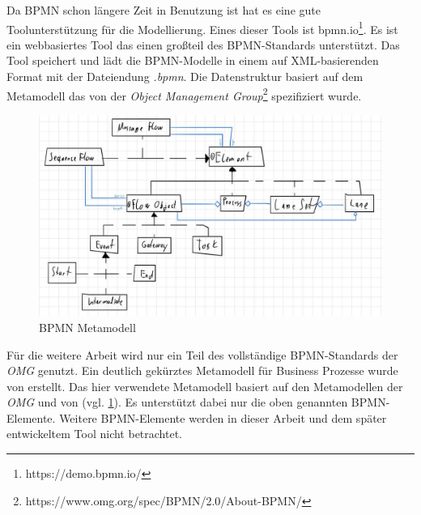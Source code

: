 Da BPMN schon längere Zeit in Benutzung ist hat es eine gute Toolunterstützung für die Modellierung.
Eines dieser Tools ist bpmn.io\footnote{https://demo.bpmn.io/}.
Es ist ein webbasiertes Tool das einen großteil des BPMN-Standards unterstützt.
Das Tool speichert und lädt die BPMN-Modelle in einem auf XML-basierenden Format mit der Dateiendung \emph{.bpmn}.
Die Datenstruktur basiert auf dem Metamodell das von der \emph{Object Management Group}\footnote{https://www.omg.org/spec/BPMN/2.0/About-BPMN/} spezifiziert wurde.

\begin{figure}
    \centering
    \includegraphics[width=\textwidth,keepaspectratio]{../images/bpmnMetamodell.jpg}%
    \caption{BPMN Metamodell}%
    \label{fig:bpmnMetamodell}
\end{figure}

Für die weitere Arbeit wird nur ein Teil des vollständige BPMN-Standards der \emph{OMG} genutzt.
Ein deutlich gekürztes Metamodell für Business Prozesse wurde von \cite{Loja2010} erstellt.
Das hier verwendete Metamodell basiert auf den Metamodellen der \emph{OMG} und von \cite{Loja2010} (vgl. \cref{fig:bpmnMetamodell}).
Es unterstützt dabei nur die oben genannten BPMN-Elemente.
Weitere BPMN-Elemente werden in dieser Arbeit und dem später entwickeltem Tool nicht betrachtet.

